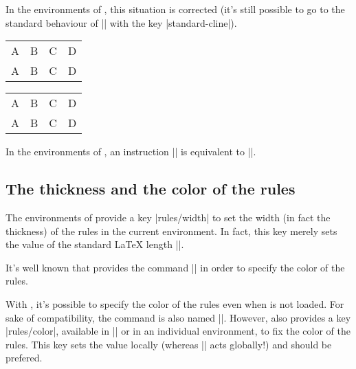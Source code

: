 \documentclass[dvipsnames]{article}%
\begin{document}
\medskip
{}
In the environments of , this situation is corrected (it's
still possible to go to the standard behaviour of |\cline| with the key |standard-cline|).

\medskip
\begin{Code}[width=10cm]
\setlength{\arrayrulewidth}{2pt}
\begin{NiceTabular}{cccc} \hline
A&B&C&D \\ \emph{}
A&B&C&D \\ \hline
\end{NiceTabular}
\end{Code}
\begin{scope}
\setlength{\arrayrulewidth}{2pt}
\begin{NiceTabular}[c]{cccc}
\hline
A&B&C&D \\ 
A&B&C&D \\ \hline
\end{NiceTabular}
\end{scope}

\medskip
In the environments of , an instruction || 
is equivalent to ||.


\subsection{The thickness and the color of the rules}


The environments of  provide a key |rules/width| to set the
width (in fact the thickness) of the rules in the current environment. In
fact, this key merely sets the value of the standard LaTeX length
|\arrayrulewidth|. 

\smallskip
It's well known that  provides the command |\arrayrulecolor| in
order to specify the color of the rules.

\smallskip
{}
With , it's possible to specify the color of the rules even when
 is not loaded. For sake of compatibility, the command is also
named |\arrayrulecolor|. However,  also provides a key
|rules/color|, available in |\NiceMatrixOptions| or in an individual
environment, to fix the color of the rules. This key sets the value locally
(whereas |\arrayrulecolor| acts globally!) and should be prefered.
\end{document}
